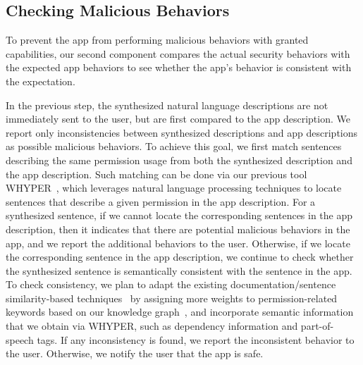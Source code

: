 \subsection{Checking Malicious Behaviors}
To prevent the app from performing malicious behaviors with granted capabilities, our second component compares the actual security behaviors with the expected app behaviors to see whether the app's behavior is consistent with the expectation.


In the previous step, the synthesized natural language descriptions are not immediately sent to the user, but are first compared to the app description. 
We report only inconsistencies between synthesized descriptions and app descriptions as possible malicious behaviors. 
To achieve this goal, we first match sentences describing the same permission usage from both the synthesized description and the app description. Such matching can be done via our previous tool
WHYPER~\cite{whyper}, which leverages natural language processing techniques to locate sentences that describe a given permission in the app description. 
For a synthesized sentence, if we cannot locate the corresponding sentences in the app description, then it indicates that there are potential malicious behaviors in the app, and we report the additional behaviors to the user. 
Otherwise, if we locate the corresponding sentence in the app description, we continue to check whether
the synthesized sentence is semantically consistent with the sentence in the app. 
To check consistency, we plan to adapt the existing documentation/sentence similarity-based techniques~\cite{sensim,docsim} by assigning more weights to permission-related keywords based on our knowledge graph~\cite{whyper}, and incorporate semantic information that we obtain via WHYPER, such as dependency information and part-of-speech tags. If any inconsistency is found, we report the inconsistent behavior to the user. Otherwise, we notify the user that the app is safe.
